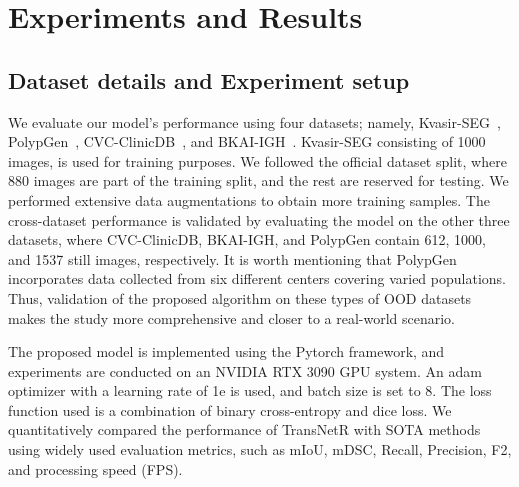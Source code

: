 \documentclass{midl} \usepackage{mwe}
\begin{document}
\section{Experiments and Results}
\subsection{Dataset details and Experiment setup}
We evaluate our model's performance using four datasets; namely, Kvasir-SEG~\cite{jha2020kvasir}, PolypGen~\cite{ali2021polypgen}, CVC-ClinicDB~\cite{bernal2015wm}, and BKAI-IGH~\cite{ngoc2021neounet}. Kvasir-SEG consisting of 1000 images, is used for training purposes. We followed the official dataset split, where 880 images are part of the training split, and the rest are reserved for testing. We performed extensive data augmentations to obtain more training samples. The cross-dataset performance is validated by evaluating the model on the other three datasets, where CVC-ClinicDB, BKAI-IGH, and PolypGen contain 612, 1000, and 1537 still images, respectively.  It is worth mentioning that PolypGen incorporates data collected from six different centers covering varied populations. Thus, validation of the proposed algorithm on these types of OOD datasets makes the study more comprehensive  and closer to a real-world scenario. 
\vspace{-1mm}

The proposed model is implemented using the Pytorch framework, and experiments are conducted on an NVIDIA RTX 3090 GPU system. An adam optimizer with a learning rate of 1e is used, and batch size is set to 8. The loss function used is a combination of binary cross-entropy and dice loss. We quantitatively compared the performance of TransNetR with SOTA methods using widely used evaluation metrics, such as mIoU, mDSC, Recall, Precision, F2, and processing speed (FPS). 
\end{document}
